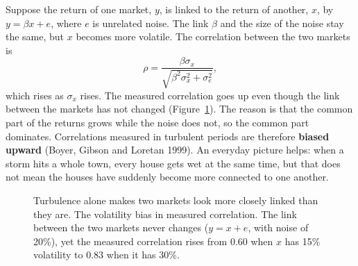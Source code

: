 Suppose the return of one market, $y$, is linked to the return of another, $x$, by $y = \beta x + e$, where $e$ is unrelated noise. The link $\beta$ and the size of the noise stay the same, but $x$ becomes more volatile. The correlation between the two markets is
\begin{equation}
  \rho = \frac{\beta\sigma_x}{\sqrt{\beta^2\sigma_x^2 + \sigma_e^2}},
  \label{eq:13-bias}
\end{equation}
which rises as $\sigma_x$ rises. The measured correlation goes up even though the link between the markets has not changed (Figure~\ref{fig:13-bias}). The reason is that the common part of the returns grows while the noise does not, so the common part dominates. Correlations measured in turbulent periods are therefore \textbf{biased upward} (Boyer, Gibson and Loretan 1999). An everyday picture helps: when a storm hits a whole town, every house gets wet at the same time, but that does not mean the houses have suddenly become more connected to one another.

\begin{figure}[htbp]
\centering
{}
\caption{Turbulence alone makes two markets look more closely linked than they are. The volatility bias in measured correlation. The link between the two markets never changes ($y = x + e$, with noise of 20\%), yet the measured correlation rises from 0.60 when $x$ has 15\% volatility to 0.83 when it has 30\%.}
\label{fig:13-bias}
\end{figure}

